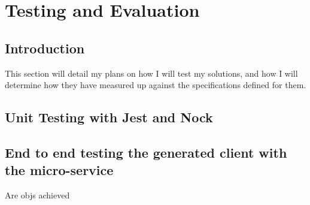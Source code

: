 \chapter{Testing and Evaluation}
\section{Introduction}
This section will detail my plans on how I will test my solutions, and how I will determine how they have measured up against the specifications defined for them.
\section{Unit Testing with Jest and Nock}
\section{End to end testing the generated client with the micro-service}
Are objs achieved
